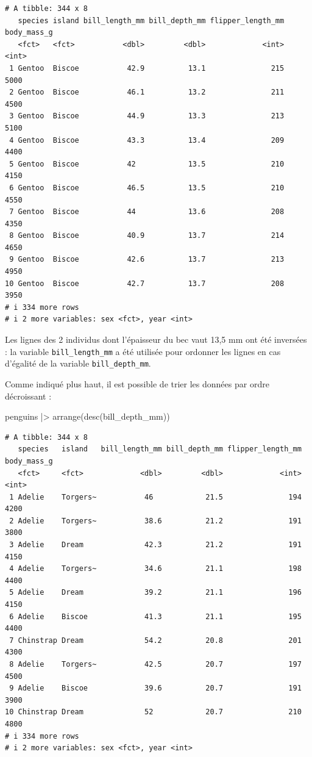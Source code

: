 \documentclass[
  a4paper,
  DIV=11,
  numbers=noendperiod,
  oneside]{scrreprt}
\newenvironment{Shaded}{}{}
\newcommand{\FunctionTok}[1]{\textcolor[rgb]{0.44,0.26,0.76}{#1}}
\newcommand{\NormalTok}[1]{\textcolor[rgb]{0.14,0.16,0.18}{#1}}
\newcommand{\SpecialCharTok}[1]{\textcolor[rgb]{0.00,0.36,0.77}{#1}}
\begin{document}
\begin{verbatim}
# A tibble: 344 x 8
   species island bill_length_mm bill_depth_mm flipper_length_mm body_mass_g
   <fct>   <fct>           <dbl>         <dbl>             <int>       <int>
 1 Gentoo  Biscoe           42.9          13.1               215        5000
 2 Gentoo  Biscoe           46.1          13.2               211        4500
 3 Gentoo  Biscoe           44.9          13.3               213        5100
 4 Gentoo  Biscoe           43.3          13.4               209        4400
 5 Gentoo  Biscoe           42            13.5               210        4150
 6 Gentoo  Biscoe           46.5          13.5               210        4550
 7 Gentoo  Biscoe           44            13.6               208        4350
 8 Gentoo  Biscoe           40.9          13.7               214        4650
 9 Gentoo  Biscoe           42.6          13.7               213        4950
10 Gentoo  Biscoe           42.7          13.7               208        3950
# i 334 more rows
# i 2 more variables: sex <fct>, year <int>
\end{verbatim}

Les lignes des 2 individus dont l'épaisseur du bec vaut 13,5 mm ont été
inversées : la variable \texttt{bill\_length\_mm} a été utilisée pour
ordonner les lignes en cas d'égalité de la variable
\texttt{bill\_depth\_mm}.

Comme indiqué plus haut, il est possible de trier les données par ordre
décroissant :

\begin{Shaded}
\begin{Highlighting}[]
\NormalTok{penguins }\SpecialCharTok{|\textgreater{}}
  \FunctionTok{arrange}\NormalTok{(}\FunctionTok{desc}\NormalTok{(bill\_depth\_mm))}
\end{Highlighting}
\end{Shaded}

\begin{verbatim}
# A tibble: 344 x 8
   species   island   bill_length_mm bill_depth_mm flipper_length_mm body_mass_g
   <fct>     <fct>             <dbl>         <dbl>             <int>       <int>
 1 Adelie    Torgers~           46            21.5               194        4200
 2 Adelie    Torgers~           38.6          21.2               191        3800
 3 Adelie    Dream              42.3          21.2               191        4150
 4 Adelie    Torgers~           34.6          21.1               198        4400
 5 Adelie    Dream              39.2          21.1               196        4150
 6 Adelie    Biscoe             41.3          21.1               195        4400
 7 Chinstrap Dream              54.2          20.8               201        4300
 8 Adelie    Torgers~           42.5          20.7               197        4500
 9 Adelie    Biscoe             39.6          20.7               191        3900
10 Chinstrap Dream              52            20.7               210        4800
# i 334 more rows
# i 2 more variables: sex <fct>, year <int>
\end{verbatim}
\end{document}
